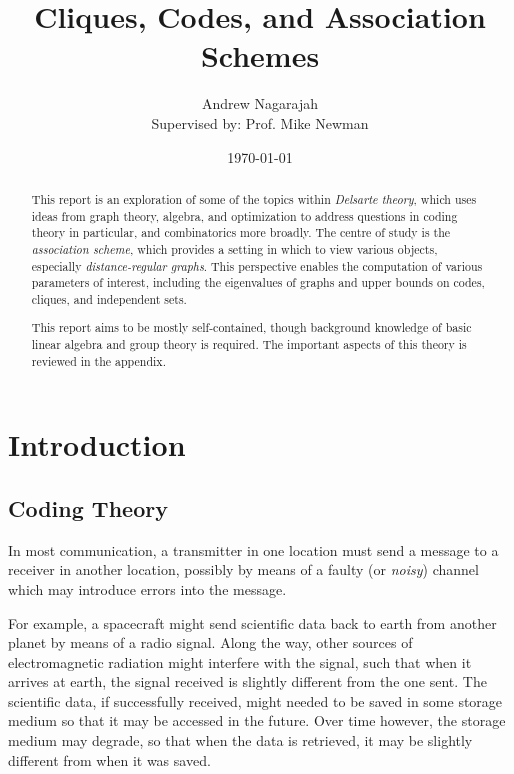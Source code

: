 \documentclass{report}
\title{Cliques, Codes, and Association Schemes}
\author{
  Andrew Nagarajah \\
  Supervised by: Prof. Mike Newman
}
\date{\today}
\begin{document}
\maketitle

\begin{abstract}

  This report is an exploration of some of the topics within \emph{Delsarte
  theory}, which uses ideas from graph theory, algebra, and optimization to
  address questions in coding theory in particular, and combinatorics more
  broadly.  The centre of study is the \emph{association scheme}, which provides
  a setting in which to view various objects, especially \emph{distance-regular
  graphs}.  This perspective enables the computation of various parameters of
  interest, including the eigenvalues of graphs and upper bounds on codes,
  cliques, and independent sets.

  This report aims to be mostly self-contained, though background knowledge of
  basic linear algebra and group theory is required.  The important aspects of
  this theory is reviewed in the appendix.

\end{abstract}

\tableofcontents

\chapter{Introduction}
  \section{Coding Theory}
    In most communication, a transmitter in one location must send a message to
    a receiver in another location, possibly by means of a faulty (or
    \textit{noisy}) channel which may introduce errors into the message.

    For example, a spacecraft might send scientific data back to earth from
    another planet by means of a radio signal.  Along the way, other sources of
    electromagnetic radiation might interfere with the signal, such that when it
    arrives at earth, the signal received is slightly different from the one
    sent.
    The scientific data, if successfully received, might needed to be saved in
    some storage medium so that it may be accessed in the future.  Over time
    however, the storage medium may degrade, so that when the data is retrieved,
    it may be slightly different from when it was saved.
\end{document}

